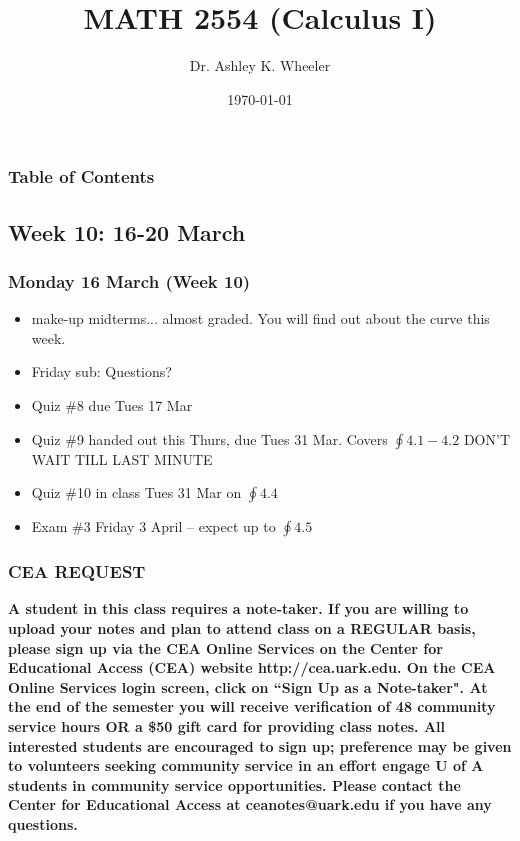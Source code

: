\documentclass[14pt]{beamer}
\title[Cal I S2015]{MATH 2554 (Calculus I)}
\subtitle{}
\author[Wheeler]{Dr. Ashley K. Wheeler}
\institute{University of Arkansas}
\date{\today}
\begin{document}
\maketitle

\begin{frame}
\frametitle{Table of Contents}
\tableofcontents
\end{frame}


\begin{frame}
\section[Week 10]{Week 10: 16-20 March}
\frametitle{Monday 16 March (Week 10)}
\small
\begin{itemize}
\item make-up midterms... almost graded.  You will find out about the curve this week.
\item Friday sub: Questions?
\item Quiz \#8 due Tues 17 Mar 	
\item Quiz \#9 handed out this Thurs, due Tues 31 Mar.  Covers $\oint 4.1-4.2$ DON'T WAIT TILL LAST MINUTE
\item Quiz \#10 in class Tues 31 Mar on $\oint 4.4$
\item Exam \#3 Friday 3 April -- expect up to $\oint 4.5$
\end{itemize}
\end{frame}

\begin{frame}
\frametitle{CEA REQUEST}
\footnotesize {\bf
A student in this class requires a note-taker. If you are willing to upload your notes and plan to attend class on a REGULAR basis, please sign up via the CEA Online Services on the Center for Educational Access (CEA) website http://cea.uark.edu. On the CEA Online Services login screen, click on ``Sign Up as a Note-taker". At the end of the semester you will receive verification of 48 community service hours OR a \$50 gift card for providing class notes. All interested students are encouraged to sign up; preference may be given to volunteers seeking community service in an effort engage U of A students in community service opportunities. Please contact the Center for Educational Access at ceanotes@uark.edu if you have any questions.}
\end{frame}
\end{document}
